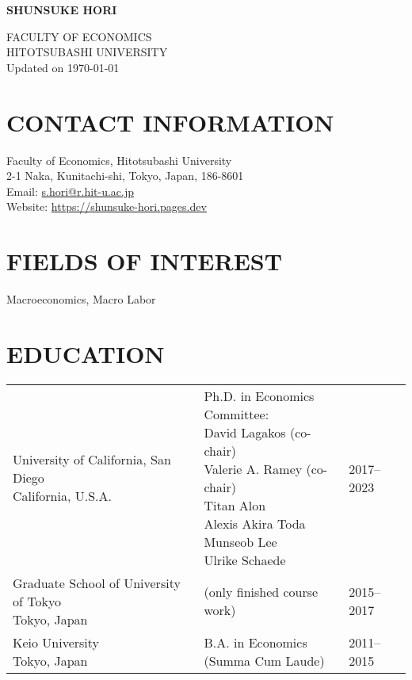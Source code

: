 \documentclass[12pt]{article}
\begin{document}
\begin{center}
    \begin{Large}
        \textbf{SHUNSUKE HORI}\\
    \end{Large}
    FACULTY OF ECONOMICS\\
    HITOTSUBASHI UNIVERSITY\\
    Updated on \today
\end{center}

\section*{CONTACT INFORMATION}
Faculty of Economics, Hitotsubashi University\\
2-1 Naka, Kunitachi-shi, Tokyo, Japan, 186-8601\\
Email: \href{mailto:s.hori@r.hit-u.ac.jp}{s.hori@r.hit-u.ac.jp}\\
Website: \url{https://shunsuke-hori.pages.dev}

\section*{FIELDS OF INTEREST}
Macroeconomics, Macro Labor

\section*{EDUCATION}
\begin{tabular}{@{}lll}
\makecell[tl]{University of California, San Diego\\\hspace{1em}California, U.S.A.}&\makecell[tl]{
Ph.D. in Economics\\
Committee:\\
\hspace{1em}David Lagakos (co-chair)\\
\hspace{1em}Valerie A. Ramey (co-chair)\\
\hspace{1em}Titan Alon\\
\hspace{1em}Alexis Akira Toda\\
\hspace{1em}Munseob Lee\\
\hspace{1em}Ulrike Schaede}&2017--2023\\
\makecell[tl]{Graduate School of University of Tokyo\\\hspace{1em}Tokyo, Japan}& (only finished course work)&2015--2017\\
\makecell[tl]{Keio University\\\hspace{1em}Tokyo, Japan}&\makecell[tl]{B.A. in Economics\\(Summa Cum Laude)}&2011--2015\\
\end{tabular}
\end{document}
